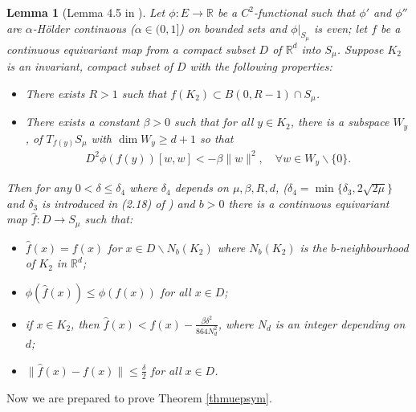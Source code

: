 \documentclass[10pt,a4paper]{article}
\newtheorem{lemma}[theorem]{Lemma}
\theoremstyle{definition} \theoremstyle{remark}
\numberwithin{equation}{section}
\newcommand{\R}{\mathbb{R}}
\begin{document}
\begin{lemma}[Lemma 4.5 in \cite{BCJN}] \label{lemflowdownsym}
	Let $\phi : E \to \R$ be a $C^2$-functional such that $\phi'$ and $\phi''$ are $\alpha$-H\"older continuous ($\alpha \in (0, 1]$) on bounded sets and $\phi|_{S_\mu}$ is even; let $f$ be a continuous equivariant map from a compact subset $D$ of $\R^d$ into $S_\mu$. Suppose $K_2$ is an invariant, compact subset of $D$ with the following properties:
	\begin{itemize}
		\item There exists $R > 1$ such that $f(K_2) \subset B(0, R - 1) \cap S_\mu$.
		\item There exists a constant $\beta > 0$ such that for all $y \in K_2$, there is a subspace $W_y$, of $T_{f(y)}S_\mu$ with $\dim W_y \geq d + 1$ so that
		\begin{align}
			D^2\phi(f(y))[w,w] < -\beta \|w\|^2, \quad \forall w \in W_y \backslash \{0\}.
		\end{align}
	\end{itemize}
	Then for any $0 < \delta \leq \delta_4$ where $\delta_4$ depends on $\mu, \beta, R, d$, ($\delta_4 = \min\{\delta_3,2\sqrt{2\mu}\}$ and $\delta_3$ is introduced in (2.18) of \cite{BCJN}) and $b > 0$ there is a continuous equivariant map $\hat f : D \to S_\mu$ such that:
	\begin{itemize}
		\item[(i)] $\hat f(x) = f(x)$ for $x \in D \backslash N_b(K_2)$ where $N_b(K_2)$ is the $b$-neighbourhood of $K_2$ in $\R^d$;
		\item[(ii)] $\phi(\hat f(x)) \leq \phi(f(x))$ for all $x \in D$;
		\item[(iii)] if $x \in K_2$, then $\hat f(x) < f(x) - \frac{\beta \delta^2}{864N_d^2}$, where $N_d$ is an integer depending on $d$;
		\item[(iv)] $\|\hat f(x) - f(x)\| \leq \frac{\delta}2$ for all $x \in D$.
	\end{itemize}
\end{lemma}

Now we are prepared to prove Theorem \ref{thmuepsym}.
\end{document}
